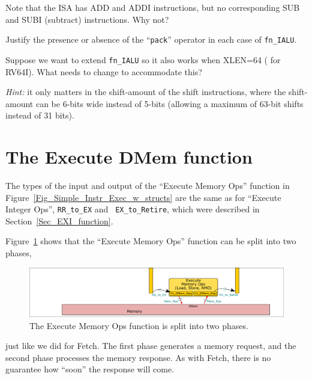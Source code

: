 \Exercise

Note that the ISA has ADD and ADDI instructions, but no corresponding
SUB and SUBI (subtract) instructions.  Why not?

\Exercise

Justify the presence or absence of the ``{\tt pack}'' operator in each
case of {\tt fn\_IALU}.

\Exercise

Suppose we want to extend {\tt fn\_IALU} so it also works when XLEN=64
({\ie} for RV64I).  What needs to change to accommodate this?

\emph{Hint:} it only matters in the shift-amount of the shift
instructions, where the shift-amount can be 6-bits wide instead of
5-bits (allowing a maximum of 63-bit shifts instead of 31 bits).

\Endexercise


\section{The Execute DMem function}

\label{Sec_DMem_function}


The types of the input and output of the ``Execute Memory Ops''
function in Figure~\ref{Fig_Simple_Instr_Exec_w_structs} are the same
as for ``Execute Integer Ops'', {\ie} {\tt RR\_to\_EX} and {\tt
EX\_to\_Retire}, which were described in Section~\ref{Sec_EXI_function}.

Figure~\ref{Fig_fn_DMem} shows that the ``Execute Memory Ops''
function can be split into two phases,
\begin{figure}[htbp]
  \centerline{\includegraphics[width=6in,angle=0]{Figures/Fig_fn_DMem}}
  \caption{\label{Fig_fn_DMem}The Execute Memory Ops function is split into two phases.}
\end{figure}
just like we did for Fetch.  The first phase generates a memory
request, and the second phase processes the memory response.  As with
Fetch, there is no guarantee how ``soon'' the response will come.

